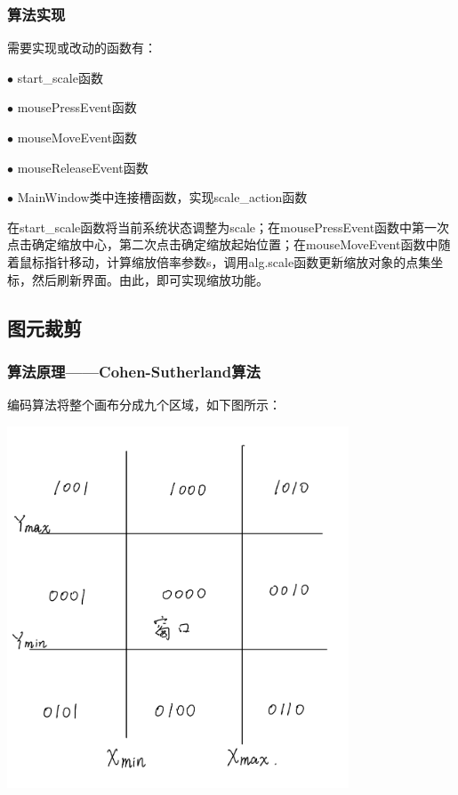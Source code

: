 \documentclass[a4paper,UTF8]{article}
\theoremstyle{definition}
\begin{document}
\subsubsection{算法实现}

需要实现或改动的函数有：

$\bullet$ start\_scale函数

$\bullet$ mousePressEvent函数

$\bullet$ mouseMoveEvent函数

$\bullet$ mouseReleaseEvent函数

$\bullet$ MainWindow类中连接槽函数，实现scale\_action函数

在start\_scale函数将当前系统状态调整为scale；在mousePressEvent函数中第一次点击确定缩放中心，第二次点击确定缩放起始位置；在mouseMoveEvent函数中随着鼠标指针移动，计算缩放倍率参数s，调用alg.scale函数更新缩放对象的点集坐标，然后刷新界面。由此，即可实现缩放功能。

\subsection{图元裁剪}

\subsubsection{算法原理——Cohen-Sutherland算法}

编码算法将整个画布分成九个区域，如下图所示：

\begin{center}
	\includegraphics[width=4in]{报告/1.png}
\end{center}
\end{document}
